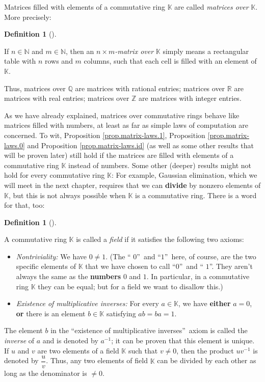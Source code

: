 \documentclass[numbers=enddot,12pt,final,onecolumn,notitlepage]{scrartcl}%
\theoremstyle{definition}
\newtheorem{defi}[theo]{Definition}
\newenvironment{definition}[1][]
{\begin{defi}[#1]\begin{leftbar}}
{\end{leftbar}\end{defi}}
\begin{document}
Matrices filled with elements of a commutative ring $\mathbb{K}$ are called
\textit{matrices over }$\mathbb{K}$. More precisely:

\begin{definition}
If $n\in\mathbb{N}$ and $m\in\mathbb{N}$, then an $n\times m$\textit{-matrix
over }$\mathbb{K}$ simply means a rectangular table with $n$ rows and $m$
columns, such that each cell is filled with an element of $\mathbb{K}$.
\end{definition}

Thus, matrices over $\mathbb{Q}$ are matrices with rational entries; matrices
over $\mathbb{R}$ are matrices with real entries; matrices over $\mathbb{Z}$
are matrices with integer entries.

As we have already explained, matrices over commutative rings behave like
matrices filled with numbers, at least as far as simple laws of computation
are concerned. To wit, Proposition \ref{prop.matrix-laws.1}, Proposition
\ref{prop.matrix-laws.0} and Proposition \ref{prop.matrix-laws.id} (as well as
some other results that will be proven later) still hold if the matrices are
filled with elements of a commutative ring $\mathbb{K}$ instead of numbers.
Some other (deeper) results might not hold for every commutative ring
$\mathbb{K}$: For example, Gaussian elimination, which we will meet in the
next chapter, requires that we can \textbf{divide} by nonzero elements of
$\mathbb{K}$, but this is not always possible when $\mathbb{K}$ is a
commutative ring. There is a word for that, too:

\begin{definition}
\label{def.field}A commutative ring $\mathbb{K}$ is called a \textit{field} if
it satisfies the following two axioms:

\begin{itemize}
\item \textit{Nontriviality:} We have $0\neq1$. (The \textquotedblleft%
$0$\textquotedblright\ and \textquotedblleft$1$\textquotedblright\ here, of
course, are the two specific elements of $\mathbb{K}$ that we have chosen to
call \textquotedblleft$0$\textquotedblright\ and \textquotedblleft%
$1$\textquotedblright. They aren't always the same as the \textbf{numbers} $0$
and $1$. In particular, in a commutative ring $\mathbb{K}$ they can be equal;
but for a field we want to disallow this.)

\item \textit{Existence of multiplicative inverses:} For every $a\in
\mathbb{K}$, we have \textbf{either} $a=0$, \textbf{or} there is an element
$b\in\mathbb{K}$ satisfying $ab=ba=1$.
\end{itemize}

The element $b$ in the \textquotedblleft existence of multiplicative
inverses\textquotedblright\ axiom is called the \textit{inverse} of $a$ and is
denoted by $a^{-1}$; it can be proven that this element is unique. If $u$ and
$v$ are two elements of a field $\mathbb{K}$ such that $v\neq0$, then the
product $uv^{-1}$ is denoted by $\dfrac{u}{v}$. Thus, any two elements of
field $\mathbb{K}$ can be divided by each other as long as the denominator is
$\neq0$.
\end{definition}
\end{document}
